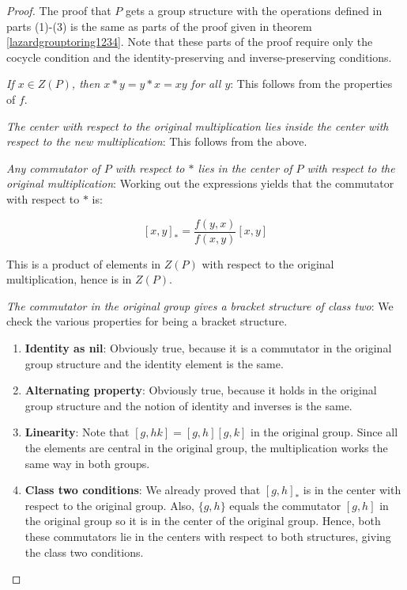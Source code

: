 \documentclass[10pt]{amsart}
\begin{document}
\begin{proof}
  The proof that $P$ gets a group structure with the operations
  defined in parts (1)-(3) is the same as parts of the proof given in
  theorem \ref{lazardgrouptoring1234}. Note that these parts of the
  proof require only the cocycle condition and the
  identity-preserving and inverse-preserving conditions.

  {\em If $x \in Z(P)$, then $x * y = y * x = xy$ for all $y$}: This
  follows from the properties of $f$.

  {\em The center with respect to the original multiplication lies
  inside the center with respect to the new multiplication}: This
  follows from the above.

  {\em Any commutator of $P$ with respect to $*$ lies in the center of
  $P$ with respect to the original multiplication}: Working out the
  expressions yields that the commutator with respect to $*$ is:

  $$[x,y]_{*} = \frac{f(y,x)}{f(x,y)}[x,y]$$

  This is a product of elements in $Z(P)$ with respect to the original
  multiplication, hence is in $Z(P)$.

  {\em The commutator in the original group gives a bracket structure
  of class two}: We check the various properties for being a bracket
  structure.

  \begin{enumerate}
  \item {\bf Identity as nil}: Obviously true, because it is a
    commutator in the original group structure and the identity element is the same.
  \item {\bf Alternating property}: Obviously true, because it holds
    in the original group structure and the notion of identity and
    inverses is the same.
  \item {\bf Linearity}: Note that $[g,hk] = [g,h][g,k]$ in the
    original group. Since all the elements are central in the original
    group, the multiplication works the same way in both groups.
  \item {\bf Class two conditions}: We already proved that $[g,h]_{*}$
    is in the center with respect to the original group. Also, $\{ g,h
    \}$ equals the commutator $[g,h]$ in the original group so it is
    in the center of the original group. Hence, both these commutators
    lie in the centers with respect to both structures, giving the
    class two conditions.
  \end{enumerate}
\end{proof}
\end{document}

